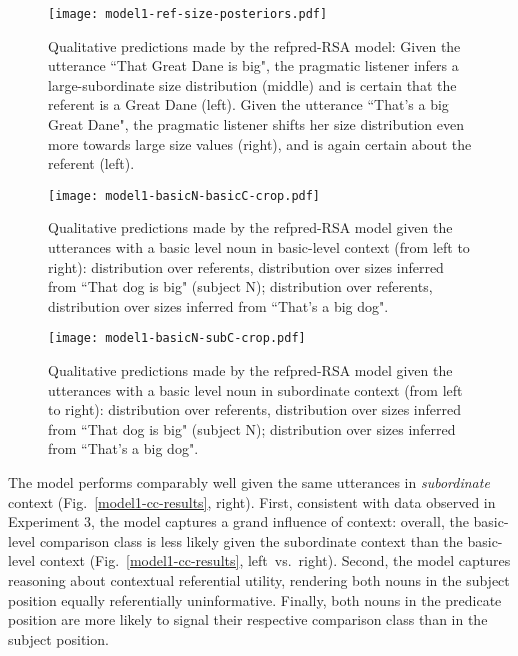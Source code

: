 \begin{figure*}[t]
	\begin{center}
		\texttt{[image: model1-ref-size-posteriors.pdf]}
	\end{center}
	\vspace{-0.3cm}
	\caption{Qualitative predictions made by the refpred-RSA model: Given the utterance ``That Great Dane is big", the pragmatic listener infers a large-subordinate size distribution (middle) and is certain that the referent is a Great Dane (left). Given the utterance ``That's a big Great Dane", the pragmatic listener shifts her size distribution even more towards large size values (right), and is again certain about the referent (left).}
	\label{model1-ref-size-results}
\end{figure*}
\begin{figure*}[h]
	\begin{center}
		\texttt{[image: model1-basicN-basicC-crop.pdf]}
	\end{center}
	\vspace{-0.3cm}
	\caption{Qualitative predictions made by the refpred-RSA model given the utterances with a basic level noun in basic-level context (from left to right): distribution over referents, distribution over sizes inferred from ``That dog is big" (subject N); distribution over referents, distribution over sizes inferred from ``That's a big dog".}
	\label{model1-basicN-basicC}
\end{figure*}
\begin{figure*}[b]
	\begin{center}
		\texttt{[image: model1-basicN-subC-crop.pdf]}
	\end{center}
	\vspace{-0.3cm}
	\caption{Qualitative predictions made by the refpred-RSA model given the utterances with a basic level noun in subordinate context (from left to right): distribution over referents, distribution over sizes inferred from ``That dog is big" (subject N); distribution over sizes inferred from ``That's a big dog".}
	\label{model1-basicN-subC}
\end{figure*}

The model performs comparably well given the same utterances in \emph{subordinate} context (Fig.~\ref{model1-cc-results}, right). First, consistent with data observed in Experiment 3, the model captures a grand influence of context: overall, the basic-level comparison class is less likely given the subordinate context than the basic-level context (Fig.~\ref{model1-cc-results}, left~vs.~right). Second, the model captures reasoning about contextual referential utility, rendering both nouns in the subject position equally referentially uninformative. Finally, both nouns in the predicate position are more likely to signal their respective comparison class than in the subject position.

